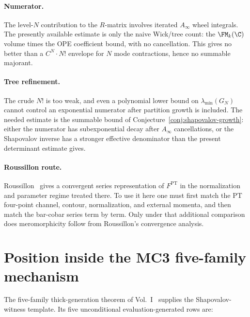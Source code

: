 \documentclass[11pt]{amsart}
\theoremstyle{definition}
\theoremstyle{remark}
\providecommand{\Ainf}{A_\infty}
\begin{document}
\paragraph{Numerator.}
The level-$N$ contribution to the $R$-matrix involves iterated
$\Ainf$ wheel integrals.  The presently available estimate is only
the naive Wick/tree count: the $\FM_k(\C)$ volume times the OPE
coefficient bound, with no cancellation.  This gives no better than a
$C^N\cdot N!$ envelope for $N$ mode contractions, hence no summable
majorant.

\paragraph{Tree refinement.}
The crude $N!$ is too weak, and even a polynomial lower bound
on $\lambda_{\min}(G_N)$ cannot control an exponential numerator after
partition growth is included.  The needed estimate is the summable
bound of Conjecture~\ref{conj:shapovalov-growth}: either the numerator
has subexponential decay after $\Ainf$ cancellations, or the
Shapovalov inverse has a stronger effective denominator than the
present determinant estimate gives.

\paragraph{Roussillon route.}
Roussillon~\cite{Roussillon24} gives a convergent series
representation of $F^{\mathrm{PT}}$ in the normalization and parameter
regime treated there. To use it here one must first match the PT
four-point channel, contour, normalization, and external momenta, and
then match the bar-cobar series term by term. Only under that
additional comparison does meromorphicity follow from Roussillon's
convergence analysis.

\section{Position inside the MC3 five-family mechanism}

The five-family thick-generation theorem
of Vol.~I~\cite{VolI} supplies the Shapovalov-witness template.  Its
five unconditional evaluation-generated rows are:
\end{document}

